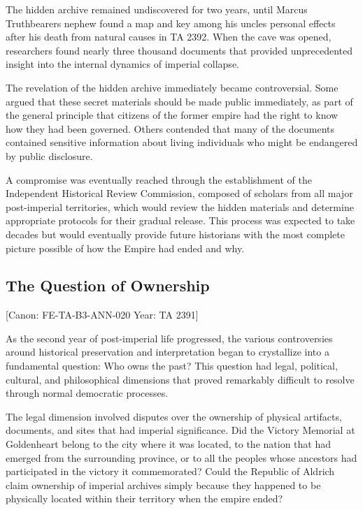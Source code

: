 The hidden archive remained undiscovered for two years, until Marcus
Truthbearer\textquotesingle s nephew found a map and key among his
uncle\textquotesingle s personal effects after his death from natural
causes in TA 2392. When the cave was opened, researchers found nearly
three thousand documents that provided unprecedented insight into the
internal dynamics of imperial collapse.

The revelation of the hidden archive immediately became controversial.
Some argued that these secret materials should be made public
immediately, as part of the general principle that citizens of the
former empire had the right to know how they had been governed. Others
contended that many of the documents contained sensitive information
about living individuals who might be endangered by public disclosure.

A compromise was eventually reached through the establishment of the
Independent Historical Review Commission, composed of scholars from all
major post-imperial territories, which would review the hidden materials
and determine appropriate protocols for their gradual release. This
process was expected to take decades but would eventually provide future
historians with the most complete picture possible of how the Empire had
ended and why.

\subsection{The Question of Ownership}\label{the-question-of-ownership}

{[}Canon: FE-TA-B3-ANN-020 \textbar{} Year: TA 2391{]}

As the second year of post-imperial life progressed, the various
controversies around historical preservation and interpretation began to
crystallize into a fundamental question: Who owns the past? This
question had legal, political, cultural, and philosophical dimensions
that proved remarkably difficult to resolve through normal democratic
processes.

The legal dimension involved disputes over the ownership of physical
artifacts, documents, and sites that had imperial significance. Did the
Victory Memorial at Goldenheart belong to the city where it was located,
to the nation that had emerged from the surrounding province, or to all
the peoples whose ancestors had participated in the victory it
commemorated? Could the Republic of Aldrich claim ownership of imperial
archives simply because they happened to be physically located within
their territory when the empire ended?


